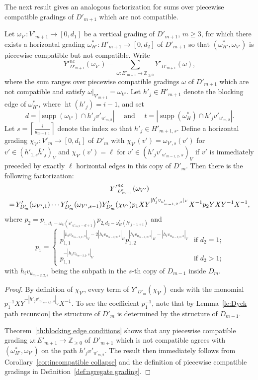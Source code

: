 \documentclass[ALCO,ThmDefs,Unicode,epreuves]{cedram}
\newcommand{\ZZ}{\mathbb{Z}}
\DeclareMathOperator{\hgt}{ht}
\DeclareMathOperator{\supp}{supp}
\newcommand*{\Mk}{\mkern -2mu}
\begin{document}
The next result gives an analogous factorization for sums over piecewise compatible gradings of $D'_{m+1}$ which are not compatible.
\begin{lemma}
 \label{le:incompatible factorization 2}
 Let $\omega_{V'}:V'_{m+1}\to[0,d_1]$ be a vertical grading of $D'_{m+1}$, $m\ge3$, for which there exists a horizontal grading $\omega^*_{H'}:H'_{m+1}\to[0,d_2]$ of $D'_{m+1}$ so that $(\omega^*_{H'},\omega_{V'})$ is piecewise compatible but not compatible.
 Write 
 \[{Y'}_{D'_{m+1}}^{nc}(\omega_{V'})=\sum\limits_{\omega:E'_{m+1}\to\ZZ_{\ge0}}Y'_{D'_{m+1}}(\omega),\]
 where the sum ranges over piecewise compatible gradings $\omega$ of $D'_{m+1}$ which are not compatible and satisfy $\omega|_{V'_{m+1}}=\omega_{V'}$.
 Let $h'_j\in H'_{m+1}$ denote the blocking edge of $\omega^*_{H'}$, where $\hgt(h'_j)=i-1$, and set 
 \[d=|\supp(\omega_{V'})\cap h'_jv'_{u'_{m,2}}|\quad\text{ and }\quad t=|\supp(\omega^*_H)\cap h'_jv'_{u'_{m,2}}|.\]
 Let $s=\left\lceil\frac{i}{u_{m-1,1}}\right\rceil$ denote the index so that $h'_j\in H'_{m+1,s}$.
 Define a horizontal grading $\chi_{V'}:V'_m\to[0,d_1]$ of $D'_m$ with $\chi_{V'}(v')=\omega_{V',s}(v')$ for $v'\in (h'_{1,s}\overline{h}'_j)_V$ and $\chi_{V'}(v')=\ell$ for $v'\in (h'_jv'_{u'_{m-1,2},s})_V$ if $v'$ is immediately preceded by exactly $\ell$ horizontal edges in this copy of $D'_m$.
 Then there is the following factorization:
 \begin{multline}
 \label{eq:incompatible factorization 2}
 {Y'}_{D'_{m+1}}^{nc}(\omega_{V'})\\
 =\Mk Y'_{D'_m}(\omega_{V',1})\cdots Y'_{D'_m}(\omega_{V',s-1})Y'_{D'_m}(\chi_{V'})p_1XY^{|h'_jv_{u'_{m-1,2},s}|_V}X^{-1} p_2YXY^{-1}X^{-1},
 \end{multline}
 where $p_2=p_{1,d_1-\omega_V(v'_{u'_{m,2}-d+1})}p_{2,d_2-\omega^*_H(h'_{j-1+t})}$ and
 \[p_1=\begin{cases} p_{1,1}^{|h_iv_{u_{m-2,2},s}|_V-2|h_iv_{u_{m-2,2},s}|_H}p_{1,2}^{|h_iv_{u_{m-2,2},s}|_H-|h_iv_{u_{m-2,2},s}|_V} & \text{if $d_2=1$;}\\ 
 p_{1,1}^{-|h_iv_{u_{m-2,2},s}|_V} & \text{if $d_2>1$;}\end{cases}\]
 with $h_iv_{u_{m-2,2,s}}$ being the subpath in the $s$-th copy of $D_{m-1}$ inside $D_m$.
\end{lemma}
\begin{proof}
 By definition of $\chi_{V'}$, every term of $Y'_{D'_m}(\chi_{V'})$ ends with the monomial $p_1^{-1}XY^{-|h'_jv'_{u'_{m-1,2},s}|_V}X^{-1}$.
 To see the coefficient $p_1^{-1}$, note that by Lemma~\ref{le:Dyck path recursion} the structure of $D'_m$ is determined by the structure of $D_{m-1}$.

 Theorem~\ref{th:blocking edge conditions} shows that any piecewise compatible grading $\omega:E'_{m+1}\to\ZZ_{\ge0}$ of $D'_{m+1}$ which is not compatible agrees with $(\omega^*_{H'},\omega_{V'})$ on the path $h'_jv'_{u'_{m,2}}$.
 The result then immediately follows from Corollary~\ref{cor:incompatible collapse} and the definition of piecewise compatible gradings in Definition~\ref{def:agregate grading}.
\end{proof}
\end{document}
